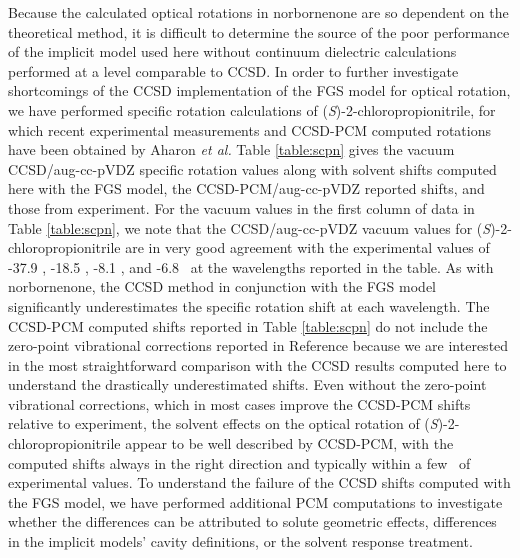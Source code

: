 Because the calculated optical rotations in norbornenone are so 
dependent on the theoretical method, it is difficult to determine the
source of the poor performance of the implicit model used here without
continuum dielectric calculations performed at a level comparable to CCSD.
In order to further investigate shortcomings of the CCSD implementation of
the FGS model for optical rotation, we have performed specific rotation
calculations of (\emph{S})-2-chloropropionitrile, for which recent
experimental measurements and CCSD-PCM computed rotations have been
obtained by Aharon \emph{et al.}\cite{Aharon:18}
Table \ref{table:scpn} gives the vacuum CCSD/aug-cc-pVDZ specific rotation
values along with solvent shifts computed here with the FGS model,
the CCSD-PCM/aug-cc-pVDZ reported shifts, and those from experiment.\cite{Aharon:18}
For the vacuum values in the first column of data in Table \ref{table:scpn},
we note that the CCSD/aug-cc-pVDZ vacuum values for (\emph{S})-2-chloropropionitrile
are in very good agreement with the experimental values\cite{Aharon:18} 
of -37.9
\rotunits, -18.5 \rotunits, -8.1 \rotunits, and -6.8 \rotunits\ at the
wavelengths reported in the table. As with norbornenone, the CCSD method in conjunction with the FGS model significantly underestimates
the specific rotation shift at each wavelength. The CCSD-PCM computed shifts
reported in Table \ref{table:scpn} do not include the zero-point vibrational
corrections reported in Reference  because we are interested
in the most straightforward comparison with the CCSD results computed
here to understand the drastically underestimated shifts. Even without
the zero-point vibrational corrections, which in most cases
improve the CCSD-PCM shifts relative to experiment, the solvent effects
on the optical rotation of (\emph{S})-2-chloropropionitrile appear to be
well described by CCSD-PCM, with the computed shifts always in the right
direction and typically within a few \rotunits\ of experimental values.
To understand the failure of the CCSD shifts computed with the FGS
model, we have performed additional PCM computations to investigate
whether the differences can be attributed to solute geometric effects,
differences in the implicit models' cavity definitions, or the 
solvent response treatment.

